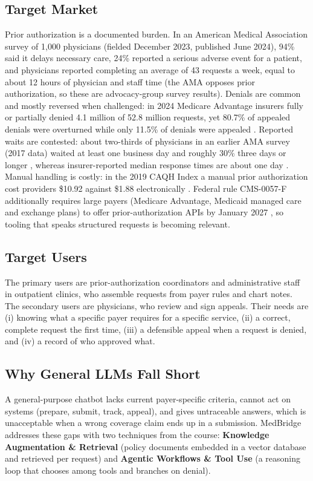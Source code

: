 \documentclass[final]{cvpr}
\begin{document}
\subsection{Target Market}
Prior authorization is a documented burden. In an American Medical Association survey of 1{,}000 physicians (fielded December 2023, published June 2024), 94\% said it delays necessary care, 24\% reported a serious adverse event for a patient, and physicians reported completing an average of 43 requests a week, equal to about 12 hours of physician and staff time \cite{ama2024} (the AMA opposes prior authorization, so these are advocacy-group survey results). Denials are common and mostly reversed when challenged: in 2024 Medicare Advantage insurers fully or partially denied 4.1 million of 52.8 million requests, yet 80.7\% of appealed denials were overturned while only 11.5\% of denials were appealed \cite{kff2024}. Reported waits are contested: about two-thirds of physicians in an earlier AMA survey (2017 data) waited at least one business day and roughly 30\% three days or longer \cite{ama2018}, whereas insurer-reported median response times are about one day \cite{kffmetrics}. Manual handling is costly: in the 2019 CAQH Index a manual prior authorization cost providers \$10.92 against \$1.88 electronically \cite{caqh2019}. Federal rule CMS-0057-F additionally requires large payers (Medicare Advantage, Medicaid managed care and exchange plans) to offer prior-authorization APIs by January 2027 \cite{cms0057f}, so tooling that speaks structured requests is becoming relevant.

\subsection{Target Users}
The primary users are prior-authorization coordinators and administrative staff in outpatient clinics, who assemble requests from payer rules and chart notes. The secondary users are physicians, who review and sign appeals. Their needs are (i) knowing what a specific payer requires for a specific service, (ii) a correct, complete request the first time, (iii) a defensible appeal when a request is denied, and (iv) a record of who approved what.

\subsection{Why General LLMs Fall Short}
A general-purpose chatbot lacks current payer-specific criteria, cannot act on systems (prepare, submit, track, appeal), and gives untraceable answers, which is unacceptable when a wrong coverage claim ends up in a submission. MedBridge addresses these gaps with two techniques from the course: \textbf{Knowledge Augmentation \& Retrieval} (policy documents embedded in a vector database and retrieved per request) and \textbf{Agentic Workflows \& Tool Use} (a reasoning loop that chooses among tools and branches on denial).
\end{document}
